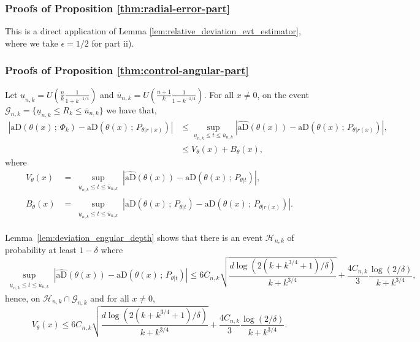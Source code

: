 \documentclass{article}
\numberwithin{equation}{section}
\newcommand{\aD}[2]{{\mathrm{aD}}\left({#1}\,;\,{#2}\right)}
\begin{document}
\subsubsection{Proofs of Proposition \ref{thm:radial-error-part}}
%
    This is a direct application of Lemma
    \ref{lem:relative_deviation_evt_estimator}, where we take \(\epsilon=1/2\)
for part ii).


\subsubsection{Proofs of Proposition
\ref{thm:control-angular-part}}

    Let
    \(\underline{u}_{n,k}=U(\frac{n}{k}\frac{1}{1+k^{-1/4}})\) and
    \(\overline{u}_{n,k}=U(\frac{n+1}{k}\frac{1}{1-k^{-1/4}})\).
    For all \(x\neq 0\), on the event
    \(\mathcal{G}_{n,k}=\{\underline{u}_{n,k}\leq
    R_k\leq \overline{u}_{n,k}\}\) we have that,
    \begin{align}
        \left|\aD{\theta(x)}{\Phi_k}-\aD{\theta(x)}{P_{\theta|r(x)}}\right|
        &\leq \sup_{\underline{u}_{n,k}\leq t \leq \overline{u}_{n,k}}
        \left|  \widehat{\mathrm{aD}}(\theta(x)) -
        \aD{\theta(x)}{P_{\theta|r(x)}} \right|,\nonumber\\
        &\leq V_\theta(x)+B_\theta(x),
        \label{eq:bis:angular_error_decomposition}
    \end{align}
    where
    \begin{align*}
        V_\theta(x) & = \sup_{\substack{\underline{u}_{n,k}\leq
        t\leq \overline{u}_{n,k}}} \left|
        \widehat{\mathrm{aD}}(\theta(x)) - \aD{\theta(x)}{P_{\theta|t}} \right|
        ,
        \\
        B_\theta(x) & = \sup_{\substack{\underline{u}_{n,k} \leq
        t\leq \overline{u}_{n,k}}}
        \left| \aD{\theta(x)}{P_{\theta|t}} -
        \aD{\theta(x)}{P_{\theta|r(x)}} \right|.
    \end{align*}

    Lemma~\ref{lem:deviation_engular_depth} shows that there is an event
    \(\mathcal{H}_{n,k}\)
    of probability at least \(1-\delta\) where
    \begin{equation*}
        \sup_{\substack{\underline{u}_{n,k}\leq
        t\leq \overline{u}_{n,k}}} \left|
        \widehat{\mathrm{aD}}(\theta(x)) -
        \aD{\theta(x)}{P_{\theta|t}} \right|\leq
        6C_{n,k}\sqrt{\frac{d\log{(2(k+k^{3/4}+1)/\delta)}}{k+k^{3/4}}}+\frac{4C_{n,k}}{3}\frac{\log(2/\delta)}{k+k^{3/4}},
    \end{equation*}
    hence, on \(\mathcal{H}_{n,k}\cap\mathcal{G}_{n,k}\) and for
    all \(x\neq 0\),
    \begin{equation}\label{eq:bis:bound_s_1_on_h}
        V_\theta(x)\leq
        6C_{n,k}\sqrt{\frac{d\log{(2(k+k^{3/4}+1)/\delta)}}{k+k^{3/4}}}+\frac{4C_{n,k}}{3}\frac{\log(2/\delta)}{k+k^{3/4}}.
    \end{equation}
\end{document}
